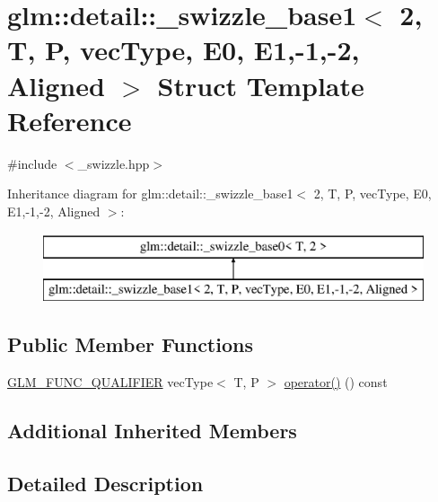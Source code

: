 \hypertarget{structglm_1_1detail_1_1__swizzle__base1_3_012_00_01_t_00_01_p_00_01vec_type_00_01_e0_00_01_e1_00-1_00-2_00_01_aligned_01_4}{}\section{glm\+::detail\+::\+\_\+swizzle\+\_\+base1$<$ 2, T, P, vec\+Type, E0, E1,-\/1,-\/2, Aligned $>$ Struct Template Reference}
\label{structglm_1_1detail_1_1__swizzle__base1_3_012_00_01_t_00_01_p_00_01vec_type_00_01_e0_00_01_e1_00-1_00-2_00_01_aligned_01_4}


{\ttfamily \#include $<$\+\_\+swizzle.\+hpp$>$}

Inheritance diagram for glm\+::detail\+::\+\_\+swizzle\+\_\+base1$<$ 2, T, P, vec\+Type, E0, E1,-\/1,-\/2, Aligned $>$\+:\begin{figure}[H]
\begin{center}
\leavevmode
\includegraphics[height=2.000000cm]{structglm_1_1detail_1_1__swizzle__base1_3_012_00_01_t_00_01_p_00_01vec_type_00_01_e0_00_01_e1_00-1_00-2_00_01_aligned_01_4}
\end{center}
\end{figure}
\subsection*{Public Member Functions}
\begin{DoxyCompactItemize}
\item 
\mbox{\hyperlink{setup_8hpp_a33fdea6f91c5f834105f7415e2a64407}{G\+L\+M\+\_\+\+F\+U\+N\+C\+\_\+\+Q\+U\+A\+L\+I\+F\+I\+ER}} vec\+Type$<$ T, P $>$ \mbox{\hyperlink{structglm_1_1detail_1_1__swizzle__base1_3_012_00_01_t_00_01_p_00_01vec_type_00_01_e0_00_01_e1_00-1_00-2_00_01_aligned_01_4_a08b7cb3886356b94ac68beb83e03564c}{operator()}} () const
\end{DoxyCompactItemize}
\subsection*{Additional Inherited Members}


\subsection{Detailed Description}
